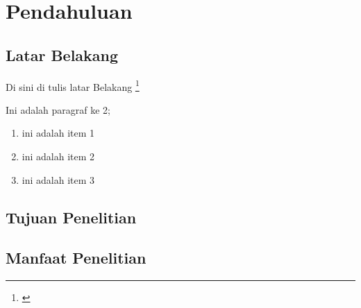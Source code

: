 \section {Pendahuluan}
\subsection {Latar Belakang}

Di sini di tulis latar Belakang \footnote{\cite{crow_case_2002}}

Ini adalah paragraf ke 2;

\begin{enumerate}
  \item ini adalah item 1
  \item ini adalah item 2
  \item ini adalah item 3
\end{enumerate}

\subsection {Tujuan Penelitian}

\subsection {Manfaat Penelitian}
